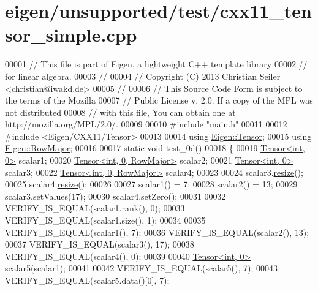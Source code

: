 \hypertarget{eigen_2unsupported_2test_2cxx11__tensor__simple_8cpp_source}{}\section{eigen/unsupported/test/cxx11\+\_\+tensor\+\_\+simple.cpp}
\label{eigen_2unsupported_2test_2cxx11__tensor__simple_8cpp_source}

\begin{DoxyCode}
00001 \textcolor{comment}{// This file is part of Eigen, a lightweight C++ template library}
00002 \textcolor{comment}{// for linear algebra.}
00003 \textcolor{comment}{//}
00004 \textcolor{comment}{// Copyright (C) 2013 Christian Seiler <christian@iwakd.de>}
00005 \textcolor{comment}{//}
00006 \textcolor{comment}{// This Source Code Form is subject to the terms of the Mozilla}
00007 \textcolor{comment}{// Public License v. 2.0. If a copy of the MPL was not distributed}
00008 \textcolor{comment}{// with this file, You can obtain one at http://mozilla.org/MPL/2.0/.}
00009 
00010 \textcolor{preprocessor}{#include "main.h"}
00011 
00012 \textcolor{preprocessor}{#include <Eigen/CXX11/Tensor>}
00013 
00014 \textcolor{keyword}{using} \hyperlink{class_eigen_1_1_tensor}{Eigen::Tensor};
00015 \textcolor{keyword}{using} \hyperlink{group__enums_ggaacded1a18ae58b0f554751f6cdf9eb13acfcde9cd8677c5f7caf6bd603666aae3}{Eigen::RowMajor};
00016 
00017 \textcolor{keyword}{static} \textcolor{keywordtype}{void} test\_0d()
00018 \{
00019   \hyperlink{class_eigen_1_1_tensor}{Tensor<int, 0>} scalar1;
00020   \hyperlink{class_eigen_1_1_tensor}{Tensor<int, 0, RowMajor>} scalar2;
00021   \hyperlink{class_eigen_1_1_tensor}{Tensor<int, 0>} scalar3;
00022   \hyperlink{class_eigen_1_1_tensor}{Tensor<int, 0, RowMajor>} scalar4;
00023 
00024   scalar3.\hyperlink{class_eigen_1_1_tensor_a5ab1ec6dc9b05d5e4db3600bc9d2cc6b}{resize}();
00025   scalar4.\hyperlink{class_eigen_1_1_tensor_a5ab1ec6dc9b05d5e4db3600bc9d2cc6b}{resize}();
00026 
00027   scalar1() = 7;
00028   scalar2() = 13;
00029   scalar3.setValues(17);
00030   scalar4.setZero();
00031 
00032   VERIFY\_IS\_EQUAL(scalar1.rank(), 0);
00033   VERIFY\_IS\_EQUAL(scalar1.size(), 1);
00034 
00035   VERIFY\_IS\_EQUAL(scalar1(), 7);
00036   VERIFY\_IS\_EQUAL(scalar2(), 13);
00037   VERIFY\_IS\_EQUAL(scalar3(), 17);
00038   VERIFY\_IS\_EQUAL(scalar4(), 0);
00039 
00040   \hyperlink{class_eigen_1_1_tensor}{Tensor<int, 0>} scalar5(scalar1);
00041 
00042   VERIFY\_IS\_EQUAL(scalar5(), 7);
00043   VERIFY\_IS\_EQUAL(scalar5.data()[0], 7);

\end{DoxyCode}
